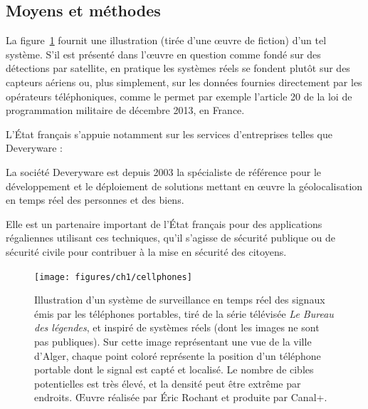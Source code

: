 	
	\subsection{Moyens et méthodes}
	La figure~\ref{fig:cellphones} fournit une illustration (tirée d'une œuvre de fiction) d'un tel système. S'il est présenté dans l'œuvre en question comme fondé sur des détections par satellite, en pratique les systèmes réels se fondent plutôt sur des capteurs aériens ou, plus simplement, sur les données fournies directement par les opérateurs téléphoniques, comme le permet par exemple l'article 20 de la loi de programmation militaire de décembre 2013, en France\footnotemark.
	
	
	L'État français s'appuie notamment sur les services d'entreprises telles que Deveryware :
	
	\begin{displayquote}
	    La société Deveryware est depuis 2003 la spécialiste de référence pour le développement et le déploiement de solutions mettant en œuvre la géolocalisation en temps réel des personnes et des biens.

        Elle est un partenaire important de l'État français pour des applications régaliennes utilisant ces techniques, qu'il s'agisse de sécurité publique ou de sécurité civile pour contribuer à la mise en sécurité des citoyens.\footnotemark
	\end{displayquote}
	
	
	\begin{figure}[htb]
		\centering
		\texttt{[image: figures/ch1/cellphones]}
		\caption[Surveillance des signaux de téléphones portables]{Illustration d'un système de surveillance en temps réel des signaux émis par les téléphones portables, tiré de la série télévisée \emph{Le Bureau des légendes}, et inspiré de systèmes réels (dont les images ne sont pas publiques). Sur cette image représentant une vue de la ville d'Alger, chaque point coloré représente la position d'un téléphone portable dont le signal est capté et localisé. Le nombre de cibles potentielles est très élevé, et la densité peut être extrême par endroits. \OE{}uvre réalisée par Éric Rochant et produite par Canal+.}
		\label{fig:cellphones}
	\end{figure}
	
